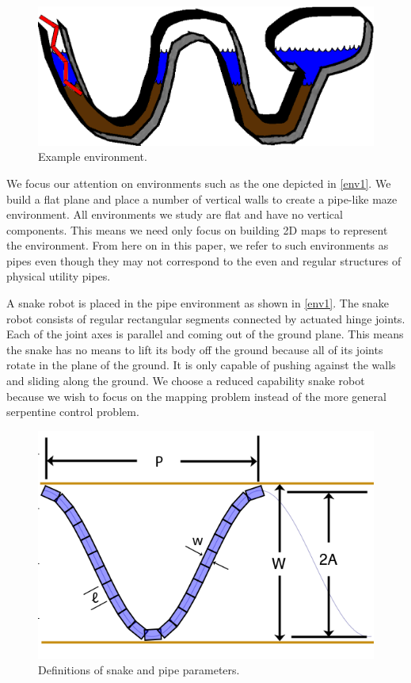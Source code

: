 \begin{figure}[htbp]
\centering
\includegraphics[keepaspectratio,width=400pt,height=0.75\textheight]{rectv2-red.eps}
\caption{Example environment.}
\label{env1}
\end{figure}



We focus our attention on environments such as the one depicted in \autoref{env1}. We build a flat plane and place a number of vertical walls to create a pipe-like maze environment. All environments we study are flat and have no vertical components. This means we need only focus on building 2D maps to represent the environment. From here on in this paper, we refer to such environments as pipes even though they may not correspond to the even and regular structures of physical utility pipes.

A snake robot is placed in the pipe environment as shown in \autoref{env1}. The snake robot consists of regular rectangular segments connected by actuated hinge joints. Each of the joint axes is parallel and coming out of the ground plane. This means the snake has no means to lift its body off the ground because all of its joints rotate in the plane of the ground. It is only capable of pushing against the walls and sliding along the ground. We choose a reduced capability snake robot because we wish to focus on the mapping problem instead of the more general serpentine control problem.

\begin{figure}[htbp]
\centering
\includegraphics[keepaspectratio,width=400pt,height=0.75\textheight]{CurveDiagram.png}
\caption{Definitions of snake and pipe parameters.}
\label{env2}
\end{figure}



